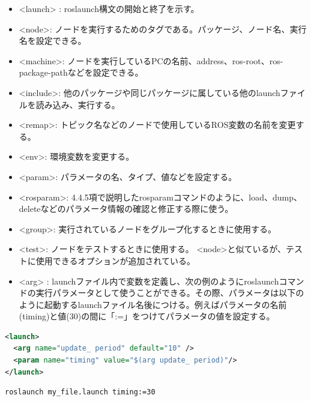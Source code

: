 \begin{itemize}
\item  <launch> : roslaunch構文の開始と終了を示す。
\item <node>: ノードを実行するためのタグである。パッケージ、ノード名、実行名を設定できる。
\item <machine>: ノードを実行しているPCの名前、address、ros-root、ros-package-pathなどを設定できる。
\item <include>: 他のパッケージや同じパッケージに属している他のlaunchファイルを読み込み、実行する。
\item <remap>: トピック名などのノードで使用しているROS変数の名前を変更する。
\item <env>: 環境変数を変更する。
\item <param>: パラメータの名、タイプ、値などを設定する。
\item <rosparam>: 4.4.5項で説明したrosparamコマンドのように、load、dump、deleteなどのパラメータ情報の確認と修正する際に使う。
\item <group>: 実行されているノードをグループ化するときに使用する。
\item <test>: ノードをテストするときに使用する。 <node>と似ているが、テストに使用できるオプションが追加されている。
\item <arg> : launchファイル内で変数を定義し、次の例のようにroslaunchコマンドの実行パラメータとして使うことができる。その際、パラメータは以下のように起動するlaunchファイル名後につける。例えばパラメータの名前(timing)と値(30)の間に「:=」をつけてパラメータの値を設定する。
\end{itemize}

\begin{lstlisting}[language=XML]
<launch>
  <arg name="update_ period" default="10" />
  <param name="timing" value="$(arg update_ period)"/>
</launch>
\end{lstlisting}

\begin{lstlisting}[language=ROS]
roslaunch my_file.launch timing:=30
\end{lstlisting}

